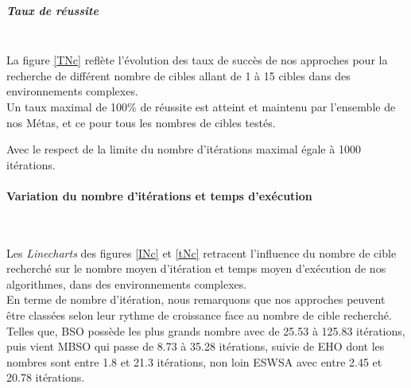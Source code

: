 

\noindent
\begin{minipage}[t]{0.48\textwidth}
	\subparagraph{Taux de réussite}
	\textbf{}\\
	
	La figure \ref{TNc} reflète l'évolution des taux de succès de nos approches pour la recherche de différent nombre de cibles allant de 1 à 15 cibles dans des environnements complexes.\\
	
	Un taux maximal de 100\% de réussite est atteint et maintenu par l'ensemble de nos Métas, et ce pour tous les nombres de cibles testés.
	
	Avec le respect de la limite du nombre d'itérations maximal égale à 1000 itérations.
	
\end{minipage}\hfill
\begin{minipage}[t]{0.55\textwidth}
	\captionsetup{width=0.8\linewidth}
	\centering{}
	\label{TNc}
\end{minipage}\hfill






\noindent
	\paragraph{Variation du nombre d'itérations et temps d'exécution}
	\textbf{ }\\
	\vspace{-0.2cm}
	
	Les \textit{Linecharts} des figures \ref{INc} et \ref{tNc} retracent l'influence du nombre de cible recherché sur le nombre moyen d'itération et temps moyen d'exécution de nos algorithmes, dans des environnements complexes.\\
	
	En terme de nombre d'itération, nous remarquons que nos approches peuvent être classées selon leur rythme de croissance face au nombre de cible recherché. Telles que, BSO possède les plus grands nombre avec de 25.53 à 125.83 itérations, puis vient MBSO qui passe de 8.73 à 35.28 itérations, suivie de EHO dont les nombres sont entre 1.8 et 21.3 itérations, non loin ESWSA avec entre 2.45 et 20.78 itérations.\\
	

